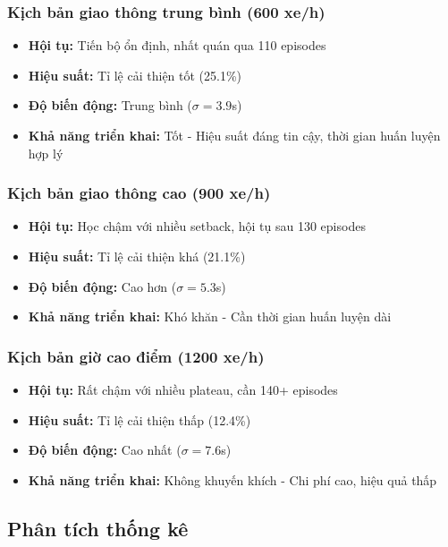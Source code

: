 \subsubsection{Kịch bản giao thông trung bình (600 xe/h)}
\begin{itemize}
    \item \textbf{Hội tụ:} Tiến bộ ổn định, nhất quán qua 110 episodes
    \item \textbf{Hiệu suất:} Tỉ lệ cải thiện tốt (25.1\%)
    \item \textbf{Độ biến động:} Trung bình ($\sigma = 3.9$s)
    \item \textbf{Khả năng triển khai:} Tốt - Hiệu suất đáng tin cậy, thời gian huấn luyện hợp lý
\end{itemize}

\subsubsection{Kịch bản giao thông cao (900 xe/h)}
\begin{itemize}
    \item \textbf{Hội tụ:} Học chậm với nhiều setback, hội tụ sau 130 episodes
    \item \textbf{Hiệu suất:} Tỉ lệ cải thiện khá (21.1\%)
    \item \textbf{Độ biến động:} Cao hơn ($\sigma = 5.3$s)
    \item \textbf{Khả năng triển khai:} Khó khăn - Cần thời gian huấn luyện dài
\end{itemize}

\subsubsection{Kịch bản giờ cao điểm (1200 xe/h)}
\begin{itemize}
    \item \textbf{Hội tụ:} Rất chậm với nhiều plateau, cần 140+ episodes
    \item \textbf{Hiệu suất:} Tỉ lệ cải thiện thấp (12.4\%)
    \item \textbf{Độ biến động:} Cao nhất ($\sigma = 7.6$s)
    \item \textbf{Khả năng triển khai:} Không khuyến khích - Chi phí cao, hiệu quả thấp
\end{itemize}

\subsection{Phân tích thống kê}

